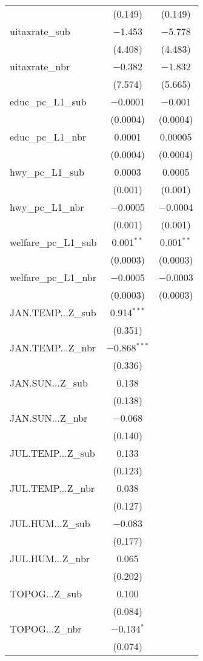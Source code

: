 \begin{table}[!htbp]
\begin{tabular}{@{\extracolsep{5pt}}lcc}
  & (0.149) & (0.149) \\ 
  uitaxrate\_sub & $-$1.453 & $-$5.778 \\ 
  & (4.408) & (4.483) \\ 
  uitaxrate\_nbr & $-$0.382 & $-$1.832 \\ 
  & (7.574) & (5.665) \\ 
  educ\_pc\_L1\_sub & $-$0.0001 & $-$0.001 \\ 
  & (0.0004) & (0.0004) \\ 
  educ\_pc\_L1\_nbr & 0.0001 & 0.00005 \\ 
  & (0.0004) & (0.0004) \\ 
  hwy\_pc\_L1\_sub & 0.0003 & 0.0005 \\ 
  & (0.001) & (0.001) \\ 
  hwy\_pc\_L1\_nbr & $-$0.0005 & $-$0.0004 \\ 
  & (0.001) & (0.001) \\ 
  welfare\_pc\_L1\_sub & 0.001$^{**}$ & 0.001$^{**}$ \\ 
  & (0.0003) & (0.0003) \\ 
  welfare\_pc\_L1\_nbr & $-$0.0005 & $-$0.0003 \\ 
  & (0.0003) & (0.0003) \\ 
  JAN.TEMP...Z\_sub & 0.914$^{***}$ &  \\ 
  & (0.351) &  \\ 
  JAN.TEMP...Z\_nbr & $-$0.868$^{***}$ &  \\ 
  & (0.336) &  \\ 
  JAN.SUN...Z\_sub & 0.138 &  \\ 
  & (0.138) &  \\ 
  JAN.SUN...Z\_nbr & $-$0.068 &  \\ 
  & (0.140) &  \\ 
  JUL.TEMP...Z\_sub & 0.133 &  \\ 
  & (0.123) &  \\ 
  JUL.TEMP...Z\_nbr & 0.038 &  \\ 
  & (0.127) &  \\ 
  JUL.HUM...Z\_sub & $-$0.083 &  \\ 
  & (0.177) &  \\ 
  JUL.HUM...Z\_nbr & 0.065 &  \\ 
  & (0.202) &  \\ 
  TOPOG...Z\_sub & 0.100 &  \\ 
  & (0.084) &  \\ 
  TOPOG...Z\_nbr & $-$0.134$^{*}$ &  \\ 
  & (0.074) &  \\ 

\end{tabular}
\end{table}
